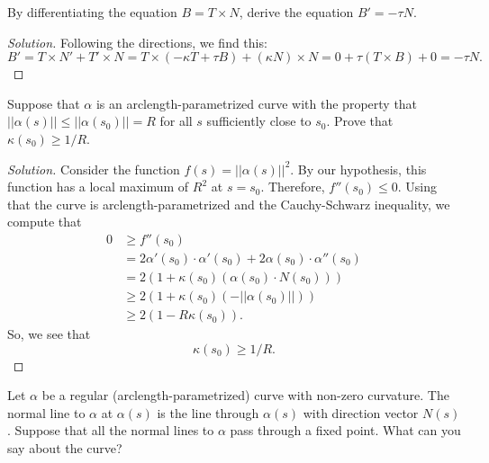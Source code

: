 \documentclass[Shifrin_Solutions_Spring_2018]{subfiles}
\begin{document}
\vspace{.5cm}


\begin{exercise}
By differentiating the equation $ B = T\times N$, derive the equation $B' = -\tau N$.
\end{exercise}

\begin{proof}[Solution]
Following the directions, we find this:
\[
B' = T \times N' + T' \times N = T \times (-\kappa T + \tau B) + (\kappa N) \times N = 0 + \tau (T\times B) + 0 = -\tau N.
\]
\end{proof}



\begin{exercise}
Suppose that $\alpha$ is an arclength-parametrized curve with the property that $||\alpha(s)|| \leq ||\alpha(s_0)|| =R$ for all $s$ sufficiently close to $s_0$. Prove that $\kappa(s_0)\geq 1/R$.
\end{exercise}

\begin{proof}[Solution]
Consider the function $f(s) = ||\alpha(s)||^2$. By our hypothesis, this function has a local maximum of $R^2$ at $s = s_0$. Therefore, $f''(s_0) \leq 0$. Using that the curve is arclength-parametrized and the Cauchy-Schwarz inequality, we compute that
\[
\begin{split}
0 & \geq f''(s_0)\\
	& = 2 \alpha'(s_0) \cdot \alpha'(s_0) + 2 \alpha(s_0) \cdot \alpha''(s_0) \\
	& = 2 \left( 1 + \kappa(s_0) (\alpha(s_0)\cdot N(s_0)) \right) \\
	& \geq 2 \left( 1 + \kappa(s_0) ( -||\alpha(s_0)||) \right) \\
	& \geq 2 \left( 1 - R \kappa(s_0) \right) .
\end{split}
\]
So, we see that
\[
\kappa(s_0) \geq 1/R .
\]
\end{proof}




\begin{exercise}
Let $\alpha$ be a regular (arclength-parametrized) curve with non-zero curvature. The normal line to $\alpha$ at $\alpha(s)$ is the line through $\alpha(s)$ with direction vector $N(s)$. Suppose that all the normal lines to $\alpha$ pass through a fixed point. What can you say about the curve?
\end{exercise}
\end{document}
